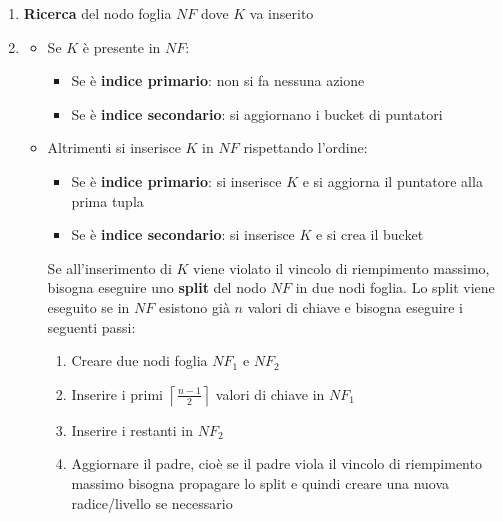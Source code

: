 \documentclass[a4paper]{article}
\begin{document}
\begin{enumerate}
  \item \textbf{Ricerca} del nodo foglia \( NF \) dove \( K \) va inserito
  \item 
  \begin{itemize}
    \item Se \( K \) è presente in \( NF \):
      \begin{itemize}
        \item Se è \textbf{indice primario}: non si fa nessuna azione
        \item Se è \textbf{indice secondario}: si aggiornano i bucket di puntatori
      \end{itemize}

    \item Altrimenti si inserisce \( K \) in \( NF \) rispettando l'ordine:
      \begin{itemize}
        \item Se è \textbf{indice primario}: si inserisce \( K \) e si aggiorna il
          puntatore alla prima tupla

        \item Se è \textbf{indice secondario}: si inserisce \( K \) e si crea
          il bucket
      \end{itemize}
      Se all'inserimento di \( K \) viene violato il vincolo di riempimento massimo,
      bisogna eseguire uno \textbf{split} del nodo \( NF \) in due nodi foglia.
      Lo split viene eseguito se in \( NF \) esistono già \( n \) valori di chiave
      e bisogna eseguire i seguenti passi:
      \begin{enumerate}
        \item Creare due nodi foglia \( NF_1 \) e \( NF_2 \) 

        \item Inserire i primi \( \left\lceil \frac{n-1}{2} \right\rceil  \) valori
          di chiave in \( NF_1 \)

        \item Inserire i restanti in \( NF_2 \)

        \item Aggiornare il padre, cioè se il padre viola il vincolo di riempimento
          massimo bisogna propagare lo split e quindi creare una nuova radice/livello
          se necessario
      \end{enumerate}
  \end{itemize}
\end{enumerate}
\end{document}
